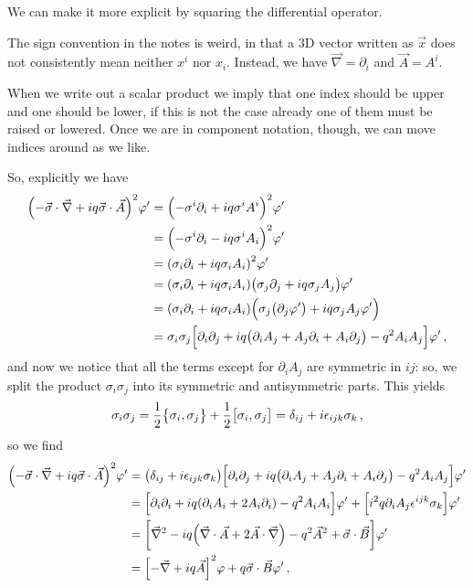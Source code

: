 \documentclass[main.tex]{subfiles}
\begin{document}
We can make it more explicit by squaring the differential operator.

The sign convention in the notes is weird, in that a 3D vector written as \(\vec{x}\) does not consistently mean neither \(x^{i}\) nor \(x_{i}\).
Instead, we have \(\vec{\nabla} = \partial_{i}  \) and \(\vec{A} = A^{i}\).

When we write out a scalar product we imply that one index should be upper and one should be lower, if this is not the case already one of them must be raised or lowered. Once we are in component notation, though, we can move indices around as we like.

So, explicitly we have 
%
\begin{subequations}
\begin{align}
\qty(- \vec{\sigma} \cdot \vec{\nabla} + i q \vec{\sigma} \cdot \vec{A})^2 \varphi'
&= \qty(- \sigma^{i} \partial_{i} + i q \sigma^{i} A^{i})^2 \varphi'  \\
&= \qty(- \sigma^{i} \partial_{i} - i q \sigma^{i} A_{i})^2 \varphi'  \\
&= \qty( \sigma_{i} \partial_{i} + i q \sigma_{i} A_{i})^2 \varphi'  \\
&= \qty( \sigma_{i} \partial_{i} + i q \sigma_{i} A_{i})
\qty( \sigma_{j} \partial_{j} + i q \sigma_{j} A_{j}) \varphi '  \\
&= \qty( \sigma_{i} \partial_{i} + i q \sigma_{i} A_{i})
\qty(\sigma_{j} \qty(\partial_{j} \varphi ') + i q \sigma_{j} A_{j} \varphi ')  \\
&= \sigma_{i} \sigma_{j} \qty[\partial_{i} \partial_{j} + iq \qty(\partial_{i} A_{j} + A_{j} \partial_{i} + A_{i} \partial_{j} ) - q^2 A_{i} A_{j}] \varphi '
\,,
\end{align}
\end{subequations}
%
and now we notice that all the terms except for \(\partial_{i} A_{j}\) are symmetric in \(ij\): so, we split the product \(\sigma_{i} \sigma_{j}\) into its symmetric and antisymmetric parts. 
This yields 
%
\begin{align}
\sigma_{i} \sigma_{j} = \frac{1}{2} \qty{\sigma_{i}, \sigma_{j}} + \frac{1}{2} \qty[\sigma_{i}, \sigma_{j}] = \delta_{ij} + i \epsilon_{ijk} \sigma_{k}
\,,
\end{align}
%
so we find 
%
\begin{subequations}
\begin{align}
\qty(- \vec{\sigma} \cdot \vec{\nabla} + i q \vec{\sigma} \cdot \vec{A})^2 \varphi'
&=
\qty(\delta_{ij} + i \epsilon_{ijk} \sigma_{k})
\qty[\partial_{i} \partial_{j} + iq \qty(\partial_{i} A_{j} + A_{j} \partial_{i} + A_{i} \partial_{j} ) - q^2 A_{i} A_{j}] \varphi '  \\
&= \qty[\partial_{i} \partial_{i} + i q \qty( \partial_{i} A_{i} + 2A_{i} \partial_{i}) - q^2 A_{i} A_{i}] \varphi '
+ \qty[i^2 q \partial_{i} A_{j} \epsilon^{ijk} \sigma_{k}] \varphi '  \\
&= \qty[\vec{\nabla}^2 - iq \qty(\vec{\nabla} \cdot \vec{A} + 2 \vec{A} \cdot \vec{\nabla}) - q^2 \vec{A}^2 
+ \vec{\sigma} \cdot \vec{B} ] \varphi'  \\
&= \qty[- \vec{\nabla} + iq \vec{A}]^2 \varphi + q\vec{\sigma} \cdot \vec{B} \varphi '
\,,
\end{align}
\end{subequations}
\end{document}
